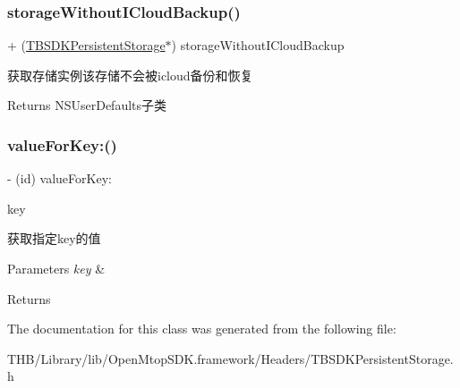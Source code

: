 \subsubsection{\texorpdfstring{storage\+Without\+I\+Cloud\+Backup()}{storageWithoutICloudBackup()}}
{\footnotesize\ttfamily + (\mbox{\hyperlink{interface_t_b_s_d_k_persistent_storage}{T\+B\+S\+D\+K\+Persistent\+Storage}}$\ast$) storage\+Without\+I\+Cloud\+Backup \begin{DoxyParamCaption}{ }\end{DoxyParamCaption}}

获取存储实例该存储不会被icloud备份和恢复 \begin{DoxyReturn}{Returns}
N\+S\+User\+Defaults子类 
\end{DoxyReturn}
\mbox{\label{interface_t_b_s_d_k_persistent_storage_abfef5c8d3962720a84582968c846af92}} 
\subsubsection{\texorpdfstring{value\+For\+Key\+:()}{valueForKey:()}}
{\footnotesize\ttfamily -\/ (id) value\+For\+Key\+: \begin{DoxyParamCaption}\item[{(N\+S\+String $\ast$)}]{key }\end{DoxyParamCaption}}

获取指定key的值 
\begin{DoxyParams}{Parameters}
{\em key} & \\
\hline
\end{DoxyParams}
\begin{DoxyReturn}{Returns}

\end{DoxyReturn}


The documentation for this class was generated from the following file\+:\begin{DoxyCompactItemize}
\item 
T\+H\+B/\+Library/lib/\+Open\+Mtop\+S\+D\+K.\+framework/\+Headers/T\+B\+S\+D\+K\+Persistent\+Storage.\+h\end{DoxyCompactItemize}
